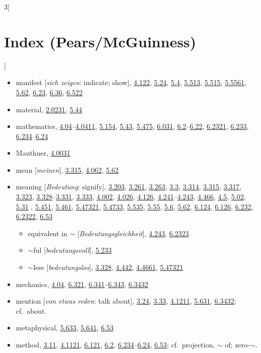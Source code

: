 \documentclass[oneside,openany,12pt]{book}
\newcommand{\indexentry}[1]{\item #1}
\newcommand{\indexsubentry}[1]{\begin{itemize} \item #1 \end{itemize}}
\newcommand{\indexref}[1]{\hyperlink{prop#1}{#1}}
\newcommand{\indexgap}{\bigskip}
\begin{document}
\begin{multicols}{3}[\section*{Index (Pears/McGuinness)}]
\begin{itemize}
\indexgap

\indexentry{manifest [\textit{sich zeigen}: indicate; show], \indexref{4.122}, \indexref{5.24}, \indexref{5.4}, \indexref{5.513}, \indexref{5.515}, \indexref{5.5561}, \indexref{5.62}, \indexref{6.23}, \indexref{6.36}, \indexref{6.522}}

\indexentry{material, \indexref{2.0231}, \indexref{5.44}}

\indexentry{mathematics, \indexref{4.04}--\indexref{4.0411}, \indexref{5.154}, \indexref{5.43}, \indexref{5.475}, \indexref{6.031}, \indexref{6.2}--\indexref{6.22}, \indexref{6.2321}, \indexref{6.233}, \indexref{6.234}--\indexref{6.24}}

\indexentry{Mauthner, \indexref{4.0031}}

\indexentry{mean [\textit{meinen}], \indexref{3.315}, \indexref{4.062}, \indexref{5.62}}

\indexentry{meaning [\textit{Bedeutung}: signify], \indexref{3.203}, \indexref{3.261}, \indexref{3.263}, \indexref{3.3}, \indexref{3.314}, \indexref{3.315}, \indexref{3.317}, \indexref{3.323}, \indexref{3.328}--\indexref{3.331}, \indexref{3.333}, \indexref{4.002}, \indexref{4.026}, \indexref{4.126}, \indexref{4.241}--\indexref{4.243}, \indexref{4.466}, \indexref{4.5}, \indexref{5.02}, \indexref{5.31} , \indexref{5.451}, \indexref{5.461}, \indexref{5.47321}, \indexref{5.4733}, \indexref{5.535}, \indexref{5.55}, \indexref{5.6}, \indexref{5.62}, \indexref{6.124}, \indexref{6.126}, \indexref{6.232}, \indexref{6.2322}, \indexref{6.53}}

   \indexsubentry{equivalent in $\sim$ [\textit{Bedeutungsgleichheit}], \indexref{4.243}, \indexref{6.2323}}

   \indexsubentry{$\sim$ful [\textit{bedeutungsvoll}], \indexref{5.233}}

   \indexsubentry{$\sim$less [\textit{bedeutungslos}], \indexref{3.328}, \indexref{4.442}, \indexref{4.4661}, \indexref{5.47321}}

\indexentry{mechanics, \indexref{4.04}, \indexref{6.321}, \indexref{6.341}--\indexref{6.343}, \indexref{6.3432}}

\indexentry{mention [\textit{von etwas reden}: talk about], \indexref{3.24}, \indexref{3.33}, \indexref{4.1211}, \indexref{5.631}, \indexref{6.3432}; cf.\ about.}

\indexentry{metaphysical, \indexref{5.633}, \indexref{5.641}, \indexref{6.53}}

\indexentry{method, \indexref{3.11}, \indexref{4.1121}, \indexref{6.121}, \indexref{6.2}, \indexref{6.234}--\indexref{6.24}, \indexref{6.53}; cf.\ projection, $\sim$ of; zero-$\sim$.}


\end{itemize}
\end{multicols}
\end{document}
